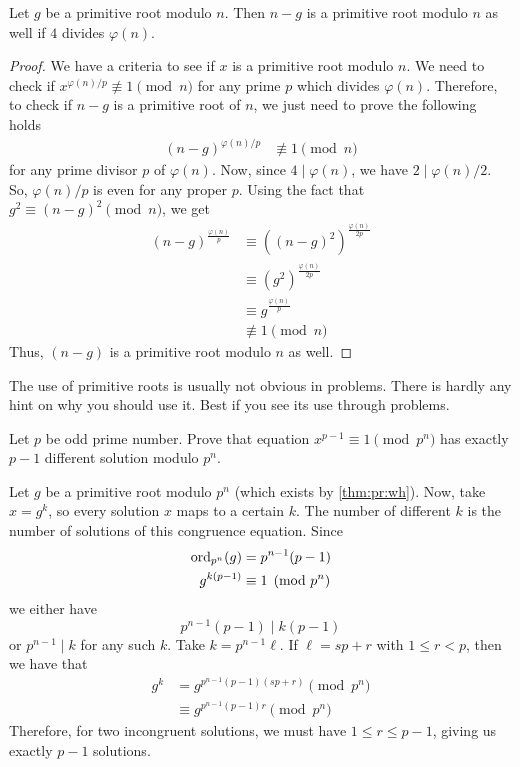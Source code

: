 \documentclass{subfile}
\begin{document}
	\begin{theorem}
		Let $g$ be a primitive root modulo $n$. Then $n-g$ is a primitive root modulo $n$ as well if $4$ divides $\varphi(n)$.
	\end{theorem}

	\begin{proof}
		We have a criteria to see if $x$ is a primitive root modulo $n$. We need to check if $x^{{\varphi(n)}/{p}}\not\equiv1\pmod n$ for any prime $p$ which divides $\varphi(n)$. Therefore, to check if $n-g$ is a primitive root of $n$, we just need to prove the following holds
		\begin{align*}
			(n-g)^{{\varphi(n)}/{p}} & \not\equiv1\pmod n
		\end{align*}
		for any prime divisor $p$ of $\varphi(n)$. Now, since $4 \mid \varphi(n)$, we have $2 \mid {\varphi(n)}/{2}$. So, ${\varphi(n)}/{p}$ is even for any proper $p$. Using the fact that $g^2\equiv(n-g)^2\pmod n$, we get
		\begin{align*}
			(n-g)^\frac{\varphi(n)}{p}
				& \equiv\left((n-g)^2\right)^{\frac{\varphi(n)}{2p}}\\
				& \equiv \left(g^2\right)^{\frac{\varphi(n)}{2p}}\\
				& \equiv g^{\frac{\varphi(n)}{p}}\\
				& \not\equiv1\pmod n
		\end{align*}
		Thus, $(n-g)$ is a primitive root modulo $n$ as well.
	\end{proof}
The use of primitive roots is usually not obvious in problems. There is hardly any hint on why you should use it. Best if you see its use through problems.
	\begin{problem}
		Let $p$ be odd prime number. Prove that equation  $x^{p-1}\equiv 1 \pmod{p^n}$ has exactly $p -1$ different solution modulo $p^{n}$.
	\end{problem}

	\begin{solution}[1]
		Let $g$ be a primitive root modulo $p^n$ (which exists by \autoref{thm:pr:wh}). Now, take $x=g^k$, so every solution $x$ maps to a certain $k$. The number of different $k$ is the number of solutions of this congruence equation. Since
			\begin{align*}
				\operatorname{ord}_{p^n}(g)
					& =p^{n-1}(p-1)\\
				g^{k(p-1)}
					& \equiv1\pmod{p^n}
			\end{align*}
		we either have $$p^{n-1}(p-1) \mid k(p-1)$$ or $p^{n-1} \mid k$ for any such $k$. Take $k=p^{n-1}\ell$. If $\ell=sp+r$ with $1\leq r<p$, then we have that
			\begin{align*}
				g^k
					& =g^{p^{n-1}(p-1)(sp+r)}\pmod{p^{n}}\\
					& \equiv g^{p^{n-1}(p-1)r}\pmod{p^n}
			\end{align*}
		Therefore, for two incongruent solutions, we must have $1\leq r\leq p-1$, giving us exactly $p-1$ solutions.
	\end{solution}
\end{document}
